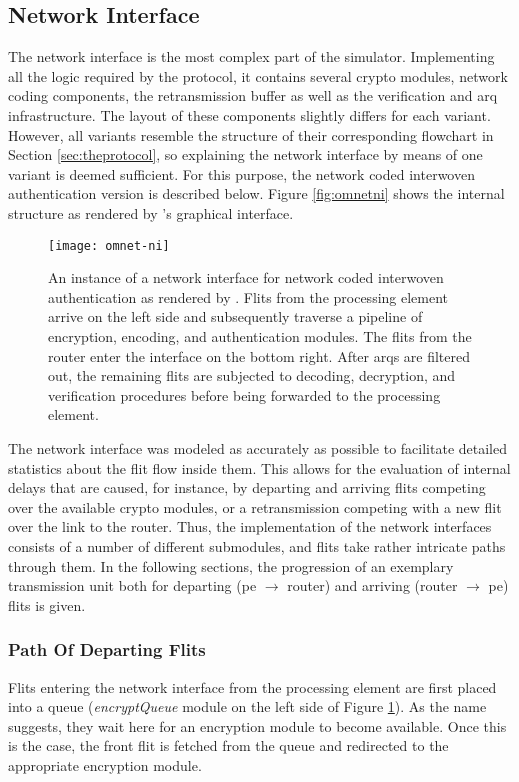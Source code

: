 \subsection{Network Interface}
The network interface is the most complex part of the simulator. Implementing all the logic required by the protocol, it contains several crypto
modules, network coding components, the retransmission buffer as well as the verification and \gls{arq} infrastructure. The layout of these components
slightly differs for each variant. However, all variants resemble the structure of their corresponding flowchart in Section \ref{sec:theprotocol}, so
explaining the network interface by means of one variant is deemed sufficient. For this purpose, the network coded interwoven authentication version
is described below. Figure \vref{fig:omnetni} shows the internal structure as rendered by \omnet{}'s graphical interface.

\begin{figure}
    \centering
    \texttt{[image: omnet-ni]}
    \caption[Simulator view of a network interface]{An instance of a network interface for network coded interwoven authentication as rendered by
    \omnet{}. Flits from the processing element arrive on the left side and subsequently traverse a pipeline of encryption, encoding, and
    authentication modules. The flits from the router enter the interface on the bottom right. After \glspl{arq} are filtered out, the remaining flits
    are subjected to decoding, decryption, and verification procedures before being forwarded to the processing element.}
    \label{fig:omnetni}
\end{figure}

The network interface was modeled as accurately as possible to facilitate detailed statistics about the flit flow inside them. This allows for the
evaluation of internal delays that are caused, for instance, by departing and arriving flits competing over the available crypto modules, or a
retransmission competing with a new flit over the link to the router. Thus, the implementation of the network interfaces consists of a number of
different submodules, and flits take rather intricate paths through them. In the following sections, the progression of an exemplary transmission unit
both for departing (\gls{pe} $\rightarrow$ router) and arriving (router $\rightarrow$ \gls{pe}) flits is given.

\subsubsection{Path Of Departing Flits}
Flits entering the network interface from the processing element are first placed into a queue (\textit{encryptQueue} module on the left side of
Figure \ref{fig:omnetni}). As the name suggests, they wait here for an encryption module to become available. Once this is the case, the front
flit is fetched from the queue and redirected to the appropriate encryption module.

